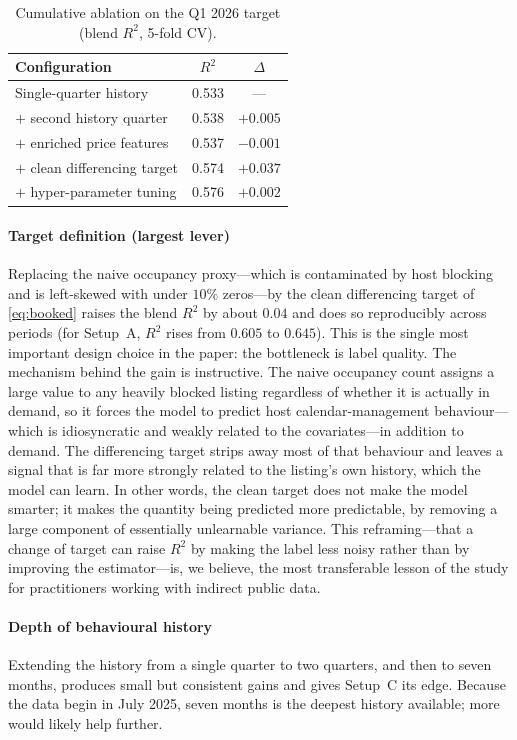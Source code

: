 \documentclass[journal]{IEEEtran}
\begin{document}
\begin{table}[!t]
\caption{Cumulative ablation on the Q1 2026 target (blend $R^2$, 5-fold CV).}
\label{tab:incremental}
\centering
\small
\begin{tabular}{lcc}
\toprule
Configuration & $R^2$ & $\Delta$ \\
\midrule
Single-quarter history & 0.533 & --- \\
\quad $+$ second history quarter & 0.538 & $+0.005$ \\
\quad $+$ enriched price features & 0.537 & $-0.001$ \\
\quad $+$ clean differencing target & 0.574 & $+0.037$ \\
\quad $+$ hyper-parameter tuning & 0.576 & $+0.002$ \\
\bottomrule
\end{tabular}
\end{table}

\paragraph{Target definition (largest lever)}
Replacing the naive occupancy proxy---which is contaminated by host blocking and
is left-skewed with under $10\%$ zeros---by the clean differencing target of
\eqref{eq:booked} raises the blend $R^2$ by about $0.04$ and does so
reproducibly across periods (for Setup~A, $R^2$ rises from $0.605$ to $0.645$).
This is the single most important design choice in the paper: the bottleneck is
label quality. The mechanism behind the gain is instructive. The naive occupancy
count assigns a large value to any heavily blocked listing regardless of whether it
is actually in demand, so it forces the model to predict host calendar-management
behaviour---which is idiosyncratic and weakly related to the covariates---in
addition to demand. The differencing target strips away most of that behaviour and
leaves a signal that is far more strongly related to the listing's own history,
which the model can learn. In other words, the clean target does not make the
model smarter; it makes the quantity being predicted more predictable, by removing a
large component of essentially unlearnable variance. This reframing---that a change
of target can raise $R^2$ by making the label less noisy rather than by improving
the estimator---is, we believe, the most transferable lesson of the study for
practitioners working with indirect public data.

\paragraph{Depth of behavioural history}
Extending the history from a single quarter to two quarters, and then to seven
months, produces small but consistent gains and gives Setup~C its edge. Because the
data begin in July 2025, seven months is the deepest history available; more would
likely help further.
\end{document}

